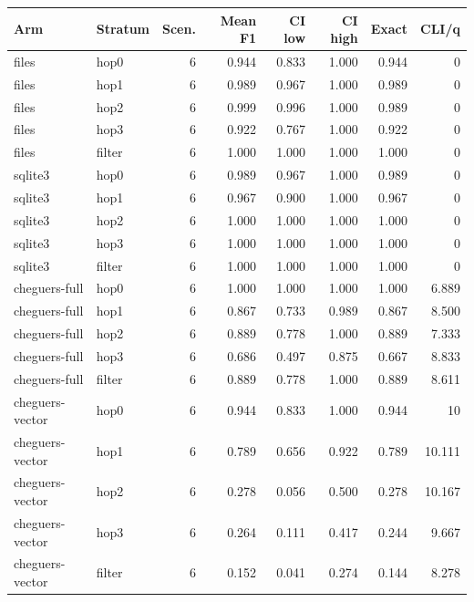 \begin{tabular}{llrrrrrr}
\toprule
Arm & Stratum & Scen. & Mean F1 & CI low & CI high & Exact & CLI/q \\
\midrule
files & hop0 & 6 & 0.944 & 0.833 & 1.000 & 0.944 & 0 \\
files & hop1 & 6 & 0.989 & 0.967 & 1.000 & 0.989 & 0 \\
files & hop2 & 6 & 0.999 & 0.996 & 1.000 & 0.989 & 0 \\
files & hop3 & 6 & 0.922 & 0.767 & 1.000 & 0.922 & 0 \\
files & filter & 6 & 1.000 & 1.000 & 1.000 & 1.000 & 0 \\
sqlite3 & hop0 & 6 & 0.989 & 0.967 & 1.000 & 0.989 & 0 \\
sqlite3 & hop1 & 6 & 0.967 & 0.900 & 1.000 & 0.967 & 0 \\
sqlite3 & hop2 & 6 & 1.000 & 1.000 & 1.000 & 1.000 & 0 \\
sqlite3 & hop3 & 6 & 1.000 & 1.000 & 1.000 & 1.000 & 0 \\
sqlite3 & filter & 6 & 1.000 & 1.000 & 1.000 & 1.000 & 0 \\
cheguers-full & hop0 & 6 & 1.000 & 1.000 & 1.000 & 1.000 & 6.889 \\
cheguers-full & hop1 & 6 & 0.867 & 0.733 & 0.989 & 0.867 & 8.500 \\
cheguers-full & hop2 & 6 & 0.889 & 0.778 & 1.000 & 0.889 & 7.333 \\
cheguers-full & hop3 & 6 & 0.686 & 0.497 & 0.875 & 0.667 & 8.833 \\
cheguers-full & filter & 6 & 0.889 & 0.778 & 1.000 & 0.889 & 8.611 \\
cheguers-vector & hop0 & 6 & 0.944 & 0.833 & 1.000 & 0.944 & 10 \\
cheguers-vector & hop1 & 6 & 0.789 & 0.656 & 0.922 & 0.789 & 10.111 \\
cheguers-vector & hop2 & 6 & 0.278 & 0.056 & 0.500 & 0.278 & 10.167 \\
cheguers-vector & hop3 & 6 & 0.264 & 0.111 & 0.417 & 0.244 & 9.667 \\
cheguers-vector & filter & 6 & 0.152 & 0.041 & 0.274 & 0.144 & 8.278 \\
\bottomrule
\end{tabular}
